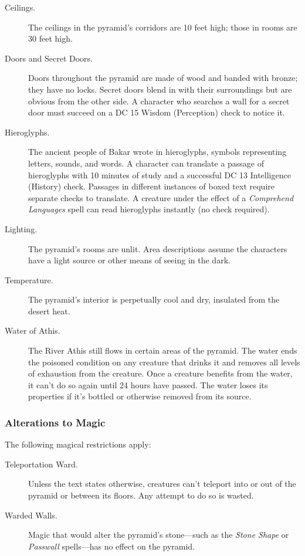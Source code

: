\documentclass[10pt,a4paper,twoside,bg=print,twocolumn,openany,nodeprecatedcode]{dndbook}
\begin{document}
\begin{description}
\item[Ceilings.]
The ceilings in the pyramid's corridors are 10 feet high; those in rooms are 30 feet high.
\item[Doors and Secret Doors.]
Doors throughout the pyramid are made of wood and banded with bronze; they have no locks. Secret doors blend in with their surroundings but are obvious from the other side. A character who searches a wall for a secret door must succeed on a DC 15 Wisdom (Perception) check to notice it.
\item[Hieroglyphs.]
The ancient people of Bakar wrote in hieroglyphs, symbols representing letters, sounds, and words. A character can translate a passage of hieroglyphs with 10 minutes of study and a successful DC 13 Intelligence (History) check. Passages in different instances of boxed text require separate checks to translate. A creature under the effect of a \textit{Comprehend Languages} spell can read hieroglyphs instantly (no check required).
\item[Lighting.]
The pyramid's rooms are unlit. Area descriptions assume the characters have a light source or other means of seeing in the dark.
\item[Temperature.]
The pyramid's interior is perpetually cool and dry, insulated from the desert heat.
\item[Water of Athis.]
The River Athis still flows in certain areas of the pyramid. The water ends the poisoned condition on any creature that drinks it and removes all levels of exhaustion from the creature. Once a creature benefits from the water, it can't do so again until 24 hours have passed. The water loses its properties if it's bottled or otherwise removed from its source.
\end{description}

\subsubsection{Alterations to Magic}
The following magical restrictions apply:


\begin{description}
\item[Teleportation Ward.]
Unless the text states otherwise, creatures can't teleport into or out of the pyramid or between its floors. Any attempt to do so is wasted.
\item[Warded Walls.]
Magic that would alter the pyramid's stone—such as the \textit{Stone Shape} or \textit{Passwall} spells—has no effect on the pyramid.
\end{description}
\end{document}
